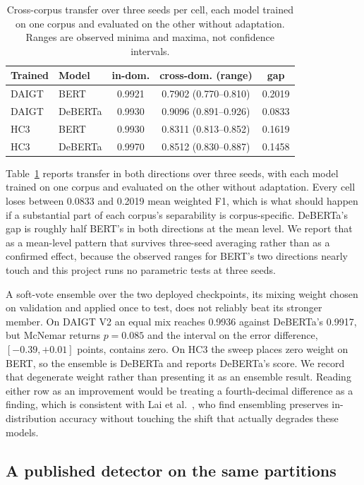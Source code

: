 \begin{table}[!ht]
\centering
\caption{Cross-corpus transfer over three seeds per cell, each model trained on one corpus and evaluated on the other without adaptation. Ranges are observed minima and maxima, not confidence intervals.}
\label{tab:cross}
\footnotesize
\setlength{\tabcolsep}{3.5pt}
\begin{tabular}{@{}llccc@{}}
\toprule
Trained & Model & in-dom. & cross-dom. (range) & gap \\
\midrule
DAIGT & BERT & 0.9921 & 0.7902 (0.770--0.810) & 0.2019 \\
DAIGT & DeBERTa & 0.9930 & 0.9096 (0.891--0.926) & 0.0833 \\
HC3 & BERT & 0.9930 & 0.8311 (0.813--0.852) & 0.1619 \\
HC3 & DeBERTa & 0.9970 & 0.8512 (0.830--0.887) & 0.1458 \\
\bottomrule
\end{tabular}
\end{table}

Table~\ref{tab:cross} reports transfer in both directions over three seeds, with each model trained on one corpus and evaluated on the other without adaptation. Every cell loses between 0.0833 and 0.2019 mean weighted F1, which is what should happen if a substantial part of each corpus's separability is corpus-specific. DeBERTa's gap is roughly half BERT's in both directions at the mean level. We report that as a mean-level pattern that survives three-seed averaging rather than as a confirmed effect, because the observed ranges for BERT's two directions nearly touch and this project runs no parametric tests at three seeds.

A soft-vote ensemble over the two deployed checkpoints, its mixing weight chosen on validation and applied once to test, does not reliably beat its stronger member. On DAIGT V2 an equal mix reaches 0.9936 against DeBERTa's 0.9917, but McNemar returns $p=0.085$ and the interval on the error difference, $[-0.39, +0.01]$ points, contains zero. On HC3 the sweep places zero weight on BERT, so the ensemble is DeBERTa and reports DeBERTa's score. We record that degenerate weight rather than presenting it as an ensemble result. Reading either row as an improvement would be treating a fourth-decimal difference as a finding, which is consistent with Lai et al.~\cite{Lai2024adaptive}, who find ensembling preserves in-distribution accuracy without touching the shift that actually degrades these models.

\subsection{A published detector on the same partitions}
\label{sec:published}

